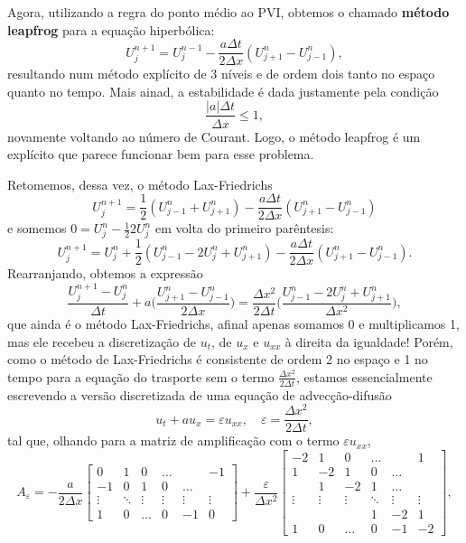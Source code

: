 \documentclass[../differential_methods.tex]{subfiles}
\begin{document}
Agora, utilizando a regra do ponto médio ao PVI, obtemos o chamado \hypertarget{leapfrog_method}{\textbf{método leapfrog}} para a equação hiperbólica:
\[
	\boxed{U_{j}^{n+1} = U_{j}^{n-1} - \frac{a\Delta t}{2\Delta x}(U_{j+1}^{n} - U_{j-1}^{n})},
\]
resultando num método explícito de 3 níveis e de ordem dois tanto no espaço quanto no tempo. Mais ainad, a estabilidade é dada justamente pela condição
\[
	\frac{| a |\Delta t}{\Delta x} \leq 1,
\]
novamente voltando ao número de Courant. Logo, o método leapfrog é um explícito que parece funcionar bem para esse problema.

Retomemos, dessa vez, o método Lax-Friedrichs
\[
	U_{j}^{n+1} = \frac{1}{2}(U_{j-1}^{n}+U_{j+1}^{n}) - \frac{a\Delta t}{2\Delta x}(U_{j+1}^{n}-U_{j-1}^{n})
\]
e somemos \(0 = U_{j}^{n} - \frac{1}{2}2U_{j}^{n}\) em volta do primeiro parêntesis:
\[
	U_{j}^{n+1} = U_{j}^{n} + \frac{1}{2}(U_{j-1}^{n}-2U_{j}^{n}+U_{j+1}^{n}) - \frac{a\Delta t}{2\Delta x}(U_{j+1}^{n}-U_{j-1}^{n}).
\]
Rearranjando, obtemos a expressão
\[
	\frac{U_{j}^{n+1}-U_{j}^{n}}{\Delta t} + a \biggl(\frac{U_{j+1}^{n}-U_{j-1}^{n}}{2\Delta x}\biggr) = \frac{\Delta x^{2}}{2\Delta t}\biggl(\frac{U_{j-1}^{n}-2U_{j}^{n}+U_{j+1}^{n}}{\Delta x^{2}}\biggr),
\]
que ainda é o método Lax-Friedrichs, afinal apenas somamos 0 e multiplicamos 1, mas ele recebeu a discretização de \(u_t\), de \(u_x\) e \(u_{xx}\) à direita da igualdade! Porém, como o método de Lax-Friedrichs é consistente de ordem 2 no espaço e 1 no tempo para a equação do trasporte sem o termo \(\frac{\Delta x^{2}}{2\Delta t}\), estamos essencialmente escrevendo a versão discretizada de uma equação de advecção-difusão
\[
	u_t + a u_x = \varepsilon u_{xx}, \quad \varepsilon = \frac{\Delta x^{2}}{2\Delta t},
\]
tal que, olhando para a matriz de amplificação com o termo \(\varepsilon u_{xx}\),
\[
	A_{\varepsilon } = -\frac{a}{2\Delta x}\begin{bmatrix}
		0      & 1      & 0      & \dotsc &        & -1     \\
		-1     & 0      & 1      & 0      & \dotsc &        \\
		\vdots & \ddots & \vdots & \vdots & \vdots & \vdots \\
		1      & 0      & \dotsc & 0      & -1     & 0
	\end{bmatrix} + \frac{\varepsilon }{\Delta x^{2}}\begin{bmatrix}
		-2     & 1      & 0      & \dotsc &        & 1      \\
		1      & -2     & 1      & 0      & \dotsc &        \\
		       & 1      & -2     & 1      & \dotsc &        \\
		\vdots & \vdots & \vdots & \ddots & \vdots & \vdots \\
		       &        &        & 1      & -2     & 1      \\
		1      & 0      & \dotsc & 0      & -1     & -2
	\end{bmatrix},
\]
\end{document}
